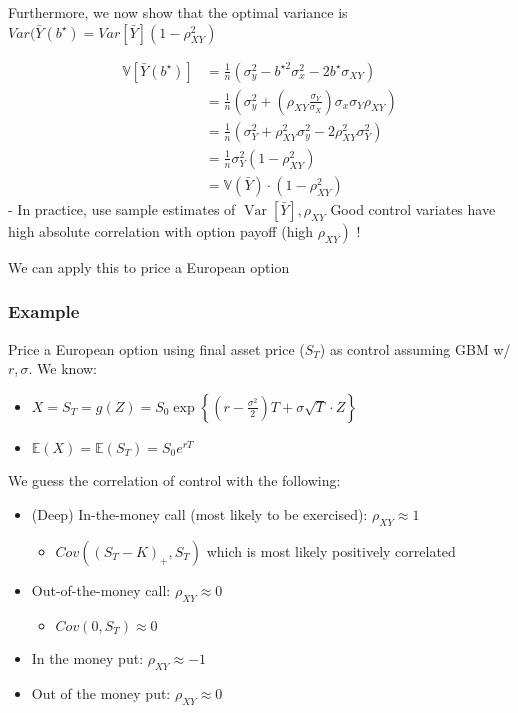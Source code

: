 \documentclass[
  oneside]{book}
\providecommand{\tightlist}{%
  \setlength{\itemsep}{0pt}\setlength{\parskip}{0pt}}
\begin{document}
Furthermore, we now show that the optimal variance is \(Var(\bar{Y}(b^{\star})=Var[\bar{Y}](1-\rho^{2}_{XY})\)

\[
\begin{aligned}
\mathbb{V}[\bar{Y}(b^{\star})] &= \frac{1}{n} (\sigma_{y}^{2}-b^{\star 2}\sigma_{x}^{2}-2b^{\star}\sigma_{XY})\\
&= \frac{1}{n} \left( \sigma_{y}^{2}+\left( \rho_{XY} \frac{\sigma_{Y}}{\sigma_{X}} \right) \sigma_{x}\sigma_{Y}\rho_{XY} \right) \\
&= \frac{1}{n} \left( \sigma_{Y}^{2}+\rho_{XY}^{2}\sigma_{y}^{2} - 2\rho^{2}_{XY}\sigma_{Y}^{2} \right) \\
&= \frac{1}{n}\sigma_{Y}^{2}(1-\rho_{XY}^{2})\\
&= \mathbb{V}(\bar{Y})\cdot(1-\rho^{2}_{XY})
\end{aligned}
\]
- In practice, use sample estimates of \(\operatorname{Var}[\bar{Y}], \rho_{X Y}\)
Good control variates have high absolute correlation with option payoff (high \(\left.\rho_{X Y}\right)\) !

We can apply this to price a European option

\hypertarget{example-6}{%
\subsubsection{Example}\label{example-6}}

Price a European option using final asset price (\(S_{T}\)) as control assuming GBM w/ \(r,\sigma\).
We know:

\begin{itemize}
\tightlist
\item
  \(X=S_{T}=g(Z)=S_{0}\exp \left\{ \left( r-\frac{\sigma^{2}}{2} \right)T+\sigma \sqrt{ T }\cdot Z \right\}\)
\item
  \(\mathbb{E}(X) = \mathbb{E}(S_{T}) = S_{0}e^{rT}\)
\end{itemize}

We guess the correlation of control with the following:

\begin{itemize}
\tightlist
\item
  (Deep) In-the-money call (most likely to be exercised): \(\rho_{XY} \approx 1\)

  \begin{itemize}
  \tightlist
  \item
    \(Cov((S_{T}-K)_{+}, S_{T})\) which is most likely positively correlated
  \end{itemize}
\item
  Out-of-the-money call: \(\rho_{XY}\approx 0\)

  \begin{itemize}
  \tightlist
  \item
    \(Cov(0, S_{T}) \approx 0\)
  \end{itemize}
\item
  In the money put: \(\rho_{XY} \approx -1\)
\item
  Out of the money put: \(\rho_{XY} \approx 0\)
\end{itemize}
\end{document}
